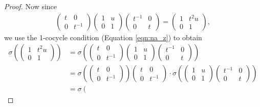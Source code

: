 \begin{proof}
Now since
\begin{align}
\left(\begin{matrix}
t & 0 \\ 0 & t^{-1}
\end{matrix}\right)
\left(\begin{matrix}
1 & u \\ 0 & 1
\end{matrix}\right)
\left(\begin{matrix}
t^{-1} & 0 \\ 0 & t
\end{matrix}\right)
=
\left(\begin{matrix}
1 & t^2u \\ 0 & 1
\end{matrix}\right),
\label{eqn:tut}
\end{align}
we use the 1-cocycle condition (Equation \ref{eqn:na_z}) to obtain
\begin{align*}
\sigma\left(
\left(\begin{matrix}
1 & t^2u \\ 0 & 1
\end{matrix}\right)
\right)
&=\sigma\left(
\left(\begin{matrix}
t & 0 \\ 0 & t^{-1}
\end{matrix}\right)
\left(\begin{matrix}
1 & u \\ 0 & 1
\end{matrix}\right)
\left(\begin{matrix}
t^{-1} & 0 \\ 0 & t
\end{matrix}\right)
\right)\\
&=
\sigma\left(
\left(\begin{matrix}
t & 0 \\ 0 & t^{-1}
\end{matrix}\right)
\right)
\left(\begin{matrix}
t & 0 \\ 0 & t^{-1}
\end{matrix}\right) \cdot
\sigma\left(
\left(\begin{matrix}
1 & u \\ 0 & 1
\end{matrix}\right)
\left(\begin{matrix}
t^{-1} & 0 \\ 0 & t
\end{matrix}\right)
\right)\\
&=
\sigma\left(

\end{align*}
\end{proof}
